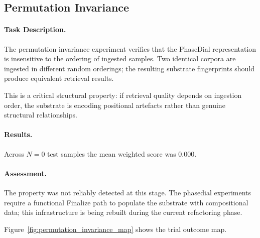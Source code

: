 \subsection{Permutation Invariance}
\label{sec:permutation_invariance}

\paragraph{Task Description.}
The permutation invariance experiment verifies that the PhaseDial
representation is insensitive to the ordering of ingested samples.
Two identical corpora are ingested in different random orderings; the
resulting substrate fingerprints should produce equivalent retrieval
results.

This is a critical structural property: if retrieval quality depends
on ingestion order, the substrate is encoding positional artefacts
rather than genuine structural relationships.

\paragraph{Results.}
Across $N = 0$ test samples the mean weighted score was 0.000.

\paragraph{Assessment.}
The property was not reliably detected at this stage.  The phasedial
experiments require a functional Finalize path to populate the substrate
with compositional data; this infrastructure is being rebuilt during
the current refactoring phase.

Figure~\ref{fig:permutation_invariance_map} shows the trial outcome map.
